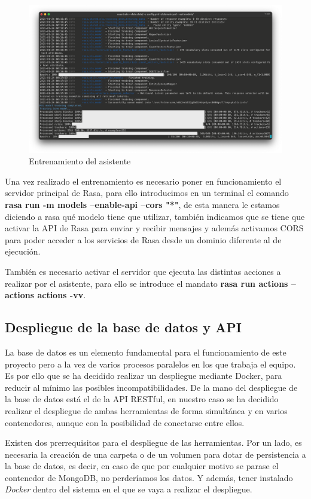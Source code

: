 \begin{figure}[H]
    \centering
    \includegraphics[width=\textwidth]{include/capturas/RasaTrain.png}
    \caption{Entrenamiento del asistente}
    \label{fig:rasa_train}
\end{figure}


Una vez realizado el entrenamiento es necesario poner en funcionamiento el servidor principal de Rasa, para ello introducimos en un terminal el comando \textbf{rasa run -m models --enable-api --cors "*"}, de esta manera le estamos diciendo a rasa qué modelo tiene que utilizar, también indicamos que se tiene que activar la API de Rasa para enviar y recibir mensajes y además activamos CORS para poder acceder a los servicios de Rasa desde un dominio diferente al de ejecución.

También es necesario activar el servidor que ejecuta las distintas acciones a realizar por el asistente, para ello se introduce el mandato \textbf{rasa run actions --actions actions -vv}. 
\newpage
\subsection{Despliegue de la base de datos y API}

La base de datos es un elemento fundamental para el funcionamiento de este proyecto pero a la vez de varios procesos paralelos en los que trabaja el equipo. Es por ello que se ha decidido realizar un despliegue mediante Docker, para reducir al mínimo las posibles incompatibilidades. 
De la mano del despliegue de la base de datos está el de la API RESTful, en nuestro caso se ha decidido realizar el despliegue de ambas herramientas de forma simultánea y en varios contenedores, aunque con la posibilidad de conectarse entre ellos.

Existen dos prerrequisitos para el despliegue de las herramientas. Por un lado, es necesaria la creación de una carpeta o de un volumen para dotar de persistencia a la base de datos, es decir, en caso de que por cualquier motivo se parase el contenedor de MongoDB, no perderíamos los datos. Y además, tener instalado \textit{Docker} dentro del sistema en el que se vaya a realizar el despliegue.

